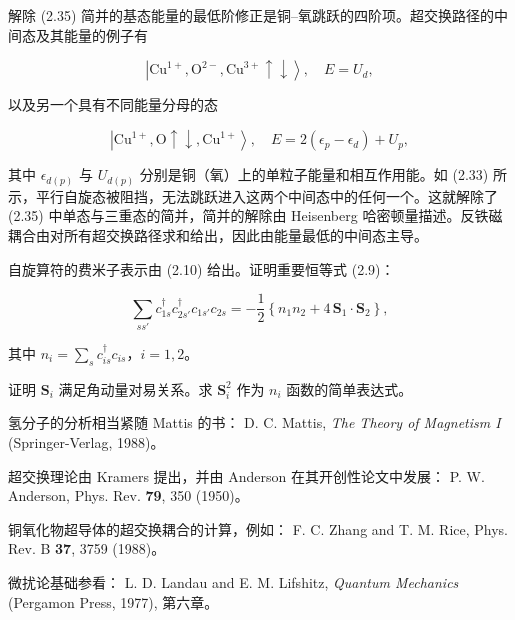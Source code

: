 解除 (2.35) 简并的基态能量的最低阶修正是铜--氧跳跃的四阶项。超交换路径的中间态及其能量的例子有

\begin{equation*}
\left| \mathrm{Cu} ^ {1+}, \mathrm{O} ^ {2-}, \mathrm{Cu} ^ {3+} \uparrow \downarrow \right\rangle , \quad E = U _ {d},
\tag{2.36}
\end{equation*}

以及另一个具有不同能量分母的态

\begin{equation*}
\left| \mathrm{Cu} ^ {1+}, \mathrm{O} \uparrow \downarrow , \mathrm{Cu} ^ {1+} \right\rangle , \quad E = 2 (\epsilon_ {p} - \epsilon_ {d}) + U _ {p},
\tag{2.37}
\end{equation*}

其中 $\epsilon_{d(p)}$ 与 $U_{d(p)}$ 分别是铜（氧）上的单粒子能量和相互作用能。如 (2.33) 所示，平行自旋态被阻挡，无法跳跃进入这两个中间态中的任何一个。这就解除了 (2.35) 中单态与三重态的简并，简并的解除由 Heisenberg 哈密顿量描述。反铁磁耦合由对所有超交换路径求和给出，因此由能量最低的中间态主导。

\begin{exercises}

\item 自旋算符的费米子表示由 (2.10) 给出。证明重要恒等式 (2.9)：

\begin{equation*}
\sum_ {ss'} c _ {1s} ^ {\dagger} c _ {2s'} ^ {\dagger} c _ {1s'} c _ {2s} = - \frac {1}{2} \left\{ n _ {1} n _ {2} + 4 \, \mathbf {S} _ {1} \cdot \mathbf {S} _ {2} \right\},
\tag{2.38}
\end{equation*}

其中 $n_i = \sum_s c_{is}^\dagger c_{is}$，$i = 1,2$。

\item 证明 $\mathbf{S}_i$ 满足角动量对易关系。求 $\mathbf{S}_i^2$ 作为 $n_i$ 函数的简单表达式。

\end{exercises}

\begin{chapbib}
\item 氢分子的分析相当紧随 Mattis 的书：
  D. C. Mattis, \textit{The Theory of Magnetism I} (Springer-Verlag, 1988)。
\item 超交换理论由 Kramers 提出，并由 Anderson 在其开创性论文中发展：
  P. W. Anderson, Phys. Rev. \textbf{79}, 350 (1950)。
\item 铜氧化物超导体的超交换耦合的计算，例如：
  F. C. Zhang and T. M. Rice, Phys. Rev. B \textbf{37}, 3759 (1988)。
\item 微扰论基础参看：
  L. D. Landau and E. M. Lifshitz, \textit{Quantum Mechanics} (Pergamon Press, 1977), 第六章。
\end{chapbib}
